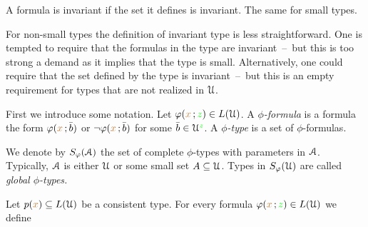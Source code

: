A formula is invariant if the set it defines is invariant.
The same for small types.

For non-small types the definition of invariant type is less straightforward.
One is tempted to require that the formulas in the type are invariant~--~but this is too strong a demand as it implies that the type is small.
Alternatively, one could require that the set defined by the type is invariant~--~but this is an empty requirement for types that are not realized in $\EuScript U$.

First we introduce some notation.
Let $\varphi({\color{brown} x}\,;{\color{green} z})\in L(\EuScript U)$.
A \emph{$\phi$-formula\/} is a formula the form $\varphi({\color{brown} x}\,;{\bar b})$ or $\neg\varphi({\color{brown} x}\,;{\bar b})$ for some ${\bar b}\in\EuScript U^{\color{green} z}$.
A \emph{$\phi$-type\/} is a set of $\phi$-formulas.

We denote by \emph{$S_\varphi(\EuScript A)$\/} the set of complete $\phi$-types with parameters in $\EuScript A$.
Typically, $\EuScript A$ is either $\EuScript U$ or some small set $A\subseteq\EuScript U$.
Types in \emph{$S_{\varphi}(\EuScript U)$\/} are called \emph{global $\phi$-types.}

   

% 

Let $p({\color{brown} x})\subseteq L(\EuScript U)$ be a consistent type.
For every formula $\varphi({\color{brown} x}\,;{\color{green} z})\in L(\EuScript U)$ we define



